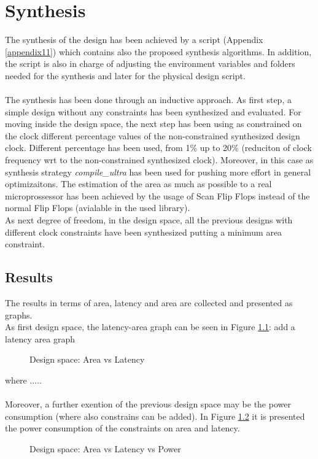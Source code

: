 \chapter{Synthesis}
\label{Synthesis}
The synthesis of the design has been achieved by a script (Appendix \ref{appendix11}) which contains also the proposed synthesis algorithms. In addition, the script is also in charge of adjusting the environment variables and folders needed for the synthesis and later for the physical design script.\\\\
The synthesis has been done through an inductive approach. As first step, a simple design without any constraints has been synthesized and evaluated. For moving inside the design space, the next step has been using as constrained on the clock different percentage values of the non-constrained synthesized design clock. Different percentage has been used, from 1\% up to 20\% (reduciton of clock frequency wrt to the non-constrained synthesized clock). Moreover, in this case as synthesis strategy \textit{compile\_ultra} has been used for pushing more effort in general optimizaitons. The estimation of the area as much as possible to a real microprossessor has been achieved by the usage of Scan Flip Flops instead of the normal Flip Flops (avialable in the used library).\\
As next degree of freedom, in the design space, all the previous designs with different clock constraints have been synthesized putting a minimum area constraint.

\section{Results}
The results in terms of area, latency and area are collected and presented as graphs.\\
As first design space, the latency-area graph can be seen in Figure \ref{fig:lat_area}:
add a latency area graph
\begin{figure}[!htbp]
\centering
\captionsetup{justification=centering}
\caption{Design space: Area vs Latency}
\label{fig:lat_area}
\end{figure}

where .....\\\\

Moreover, a further exention of the previous design space may be the power consumption (where also constrains can be added). In Figure \ref{fig:area_power_latency} it is presented the power consumption of the constraints on area and latency.

\begin{figure}[!htbp]
\centering
\captionsetup{justification=centering}
\caption{Design space: Area vs Latency vs Power}
\label{fig:area_power_latency}
\end{figure}